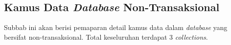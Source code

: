 
\subsection{Kamus Data \textit{Database} Non-Transaksional}

	Subbab ini akan berisi pemaparan detail kamus data dalam \textit{database} yang bersifat non-transaksional. Total keseluruhan terdapat 3 \textit{collections}.

	
		

%   	
     	